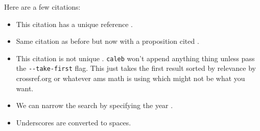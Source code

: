 \documentclass{article}
\begin{document}
Here are a few citations:
\begin{itemize}
    \item
        This citation has a unique reference \cite{mazur:eisenstein}.
    \item
        Same citation as before but now with a proposition cited \cite[Prop.
        14.2]{mazur:eisenstein}.
    \item
        This citation is not unique \cite{mazur:modular}. \verb+caleb+ won't
        append anything thing unless pass the \verb+--take-first+ flag. This
        just takes the first result sorted by relevance by crossref.org or
        whatever ams math is using which might not be what you want.
    \item
        We can narrow the search by specifying the year
        \cite{mazur:modular:2000}.
    \item
        Underscores are converted to spaces.
        \cite{ribet:galois_real_multiplication:1976}
\end{itemize}



\end{document}
